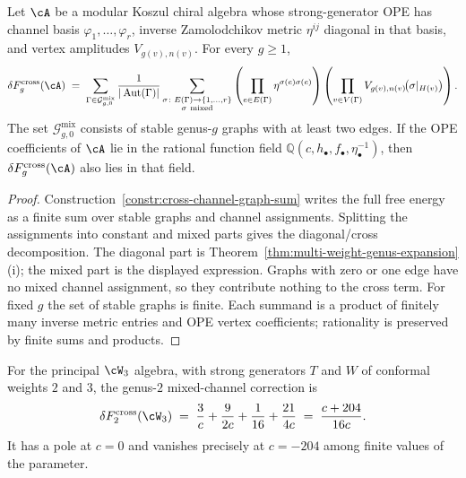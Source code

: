 \begin{proposition}
\label{prop:delta-f-cross-universal-formula}
Let $\cA$ be a modular Koszul chiral algebra whose strong-generator
OPE has channel basis
$\varphi_1,\ldots,\varphi_r$, inverse Zamolodchikov metric
$\eta^{ij}$ diagonal in that basis, and vertex amplitudes
$V_{g(v),n(v)}$. For every $g\geq 1$,
\begin{equation}\label{eq:kos-vii-universal-correction}
\delta F_g^{\mathrm{cross}}(\cA)
\;=\;
\sum_{\Gamma\in\mathcal{G}_{g,0}^{\mathrm{mix}}}
\frac{1}{|\operatorname{Aut}(\Gamma)|}
\sum_{\substack{\sigma\colon E(\Gamma)\to\{1,\ldots,r\}\\
\sigma\ \mathrm{mixed}}}
\left(
\prod_{e\in E(\Gamma)}
\eta^{\sigma(e)\sigma(e)}
\right)
\left(
\prod_{v\in V(\Gamma)}
V_{g(v),n(v)}\!\bigl(\sigma|_{H(v)}\bigr)
\right).
\end{equation}
The set $\mathcal{G}_{g,0}^{\mathrm{mix}}$ consists of stable
genus-$g$ graphs with at least two edges. If the OPE coefficients of
$\cA$ lie in the rational function field
$\mathbb{Q}(c,h_\bullet,f_\bullet,\eta_\bullet^{-1})$, then
$\delta F_g^{\mathrm{cross}}(\cA)$ also lies in that field.
\end{proposition}

\begin{proof}
Construction~\textup{\ref{constr:cross-channel-graph-sum}} writes
the full free energy as a finite sum over stable graphs and channel
assignments. Splitting the assignments into constant and mixed parts
gives the diagonal/cross decomposition. The diagonal part is
Theorem~\textup{\ref{thm:multi-weight-genus-expansion}}\textup{(i)};
the mixed part is the displayed expression. Graphs with zero or one
edge have no mixed channel assignment, so they contribute nothing to
the cross term. For fixed $g$ the set of stable graphs is finite.
Each summand is a product of finitely many inverse metric entries and
OPE vertex coefficients; rationality is preserved by finite sums and
products.
\end{proof}

\begin{theorem}
\label{thm:delta-f-cross-w3-g2}
For the principal $\cW_3$ algebra, with strong generators $T$ and $W$
of conformal weights $2$ and $3$, the genus-$2$ mixed-channel
correction is
\begin{equation}\label{eq:kos-vii-w3-g2-explicit}
\delta F_2^{\mathrm{cross}}(\cW_3)
\;=\;
\frac{3}{c}+\frac{9}{2c}+\frac{1}{16}+\frac{21}{4c}
\;=\;
\frac{c+204}{16c}.
\end{equation}
It has a pole at $c=0$ and vanishes precisely at $c=-204$ among finite
values of the parameter.
\end{theorem}

